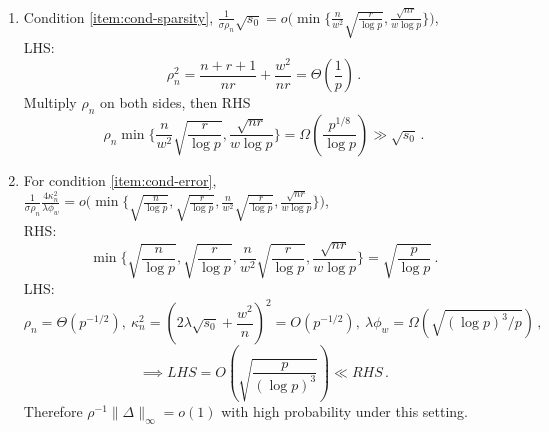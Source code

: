 \documentclass[11pt]{article}
\begin{document}
\begin{enumerate}
\item Condition \ref{item:cond-sparsity}, $\frac{1}{\sigma\rho_n}\sqrt{s_0} = o\bigg(\min \bigg\{\frac{n}{w^2}\sqrt{\frac{r}{\log p}},\frac{\sqrt{nr}}{w\log p}\bigg\}\bigg)$,\\
LHS:
\[
    \rho_n^2 = \frac{n+r+1}{ nr}+\frac{w^2}{nr} = \Theta\left(\frac{1}{p}\right)\,.
\]
Multiply $\rho_n$ on both sides, then RHS
\[
    \rho_n\min \bigg\{\frac{n}{w^2}\sqrt{\frac{r}{\log p}},\frac{\sqrt{nr}}{w\log p}\bigg\} = \Omega\left(\frac{p^{1/8}}{\log p}\right)\gg \sqrt{s_0}\,.
\]
\item For condition \ref{item:cond-error}, $\frac{1}{\sigma\rho_n}\frac{4\kappa_n^2}{\lambda\phi_w} = o\bigg(\min\bigg\{\sqrt{\frac{n}{\log p}},\sqrt{\frac{r}{\log p}},\frac{n}{w^2}\sqrt{\frac{r}{\log p}},\frac{\sqrt{nr}}{w\log p}\bigg\}\bigg)$,\\
RHS:
\[
\min\bigg\{\sqrt{\frac{n}{\log p}},\sqrt{\frac{r}{\log p}},\frac{n}{w^2}\sqrt{\frac{r}{\log p}},\frac{\sqrt{nr}}{w\log p}\bigg\} = \sqrt{\frac{p}{\log p}}\,.
\]
LHS:
\[
\rho_n=\Theta(p^{-1/2}),\ \kappa_n^2 = \left(2\lambda\sqrt{s_0}+\frac{w^2}{n}\right)^2=O(p^{-1/2}),\ \lambda\phi_w = \Omega\left(\sqrt{(\log p)^3/p}\right)\,,
\]
\[
\implies LHS = O\left(\sqrt{\frac{p}{(\log p)^3}}\right)\ll RHS\,.
\]
Therefore $\rho^{-1}\|\Delta\|_\infty=o(1)$ with high probability under this setting.
\end{enumerate}
\end{document}
